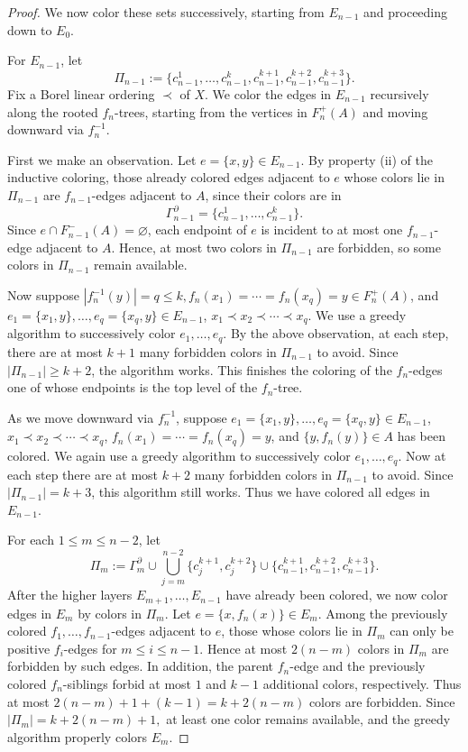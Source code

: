 \documentclass[11pt, reqno, a4paper]{amsart}
\theoremstyle{definition}
\theoremstyle{plain}
\begin{document}
\begin{proof}
We now color these sets successively, starting from $E_{n-1}$ and proceeding down to $E_0$.

For $E_{n-1}$, let
$$
\Pi_{n-1}:=\{c_{n-1}^1,\dots,c_{n-1}^k,c_{n-1}^{k+1},c_{n-1}^{k+2},c_{n-1}^{k+3}\}.
$$
Fix a Borel linear ordering $\prec$ of $X$. We color the edges in $E_{n-1}$ recursively along the rooted $f_n$-trees, starting from the vertices in $F_n^+(A)$ and moving downward via $f_n^{-1}$.

First we make an observation. Let $e=\{x,y\}\in E_{n-1}$. By property \textup{(ii)} of the inductive coloring, those  already colored edges adjacent to $e$ whose colors lie in $\Pi_{n-1}$ are $f_{n-1}$-edges adjacent to $A$, since their colors are in 
$$
\Gamma_{n-1}^\partial=\{c_{n-1}^1,\dots,c_{n-1}^k\}.
$$
Since $e\cap F_{n-1}^-(A)=\varnothing$, each endpoint of $e$ is incident to at most one $f_{n-1}$-edge adjacent to $A$. Hence, at most two colors in $\Pi_{n-1}$ are forbidden, so some colors in $\Pi_{n-1}$ remain available.

Now suppose $|f_n^{-1}(y)|=q\le k,f_n(x_1)=\cdots=f_n(x_q)=y\in F_n^+(A)$, and $e_1=\{x_1, y\}, \dots, e_q=\{x_q, y\}\in E_{n-1}$, $x_1\prec x_2\prec \cdots \prec x_q$. We use a greedy algorithm to successively color $e_1, \dots, e_q$. By the above observation, at each step, there are at most $k+1$ many forbidden colors in $\Pi_{n-1}$ to avoid. Since $|\Pi_{n-1}|\geq k+2$, the algorithm works. This finishes the coloring of the $f_n$-edges one of whose endpoints is the top level of the $f_n$-tree. 

As we move downward via $f_n^{-1}$, suppose $e_1=\{x_1,y\}, \dots, e_q=\{x_q, y\}\in E_{n-1}$, $x_1\prec x_2\prec \cdots \prec x_q$, $f_n(x_1)=\cdots=f_n(x_q)=y$, and $\{y, f_n(y)\}\in A$ has been colored. We again use a greedy algorithm to successively color $e_1, \dots, e_q$. Now at each step there are at most $k+2$ many forbidden colors in $\Pi_{n-1}$ to avoid. Since $|\Pi_{n-1}|=k+3$, this algorithm still works. Thus we have colored all edges in $E_{n-1}$. 

For each $1\le m\le n-2$, let
$$
\Pi_m
:=
\Gamma_m^\partial
\cup
\bigcup_{j=m}^{n-2}\{c_j^{k+1},c_j^{k+2}\}
\cup
\{c_{n-1}^{k+1},c_{n-1}^{k+2},c_{n-1}^{k+3}\}.
$$
After the higher layers
$E_{m+1},\dots,E_{n-1}$
have already been colored, we now color edges in $E_m$ by colors in $\Pi_m$. 
Let $e=\{x,f_n(x)\}\in E_m$. Among the previously
colored $f_1,\ldots,f_{n-1}$-edges adjacent to
$e$, those whose colors lie in $\Pi_m$ can only be positive
$f_i$-edges for $m\le i\le n-1$. Hence at most
$2(n-m)$ colors in $\Pi_m$ are forbidden by such edges. In addition, the parent $f_n$-edge and the previously colored $f_n$-siblings forbid at most $1$ and $k-1$ additional colors, respectively.
Thus at most
$
2(n-m)+1+(k-1)=k+2(n-m)
$
colors are forbidden. Since
$
|\Pi_m|=k+2(n-m)+1,
$
at least one color remains available, and the greedy algorithm
properly colors $E_m$.



\end{proof}
\end{document}
